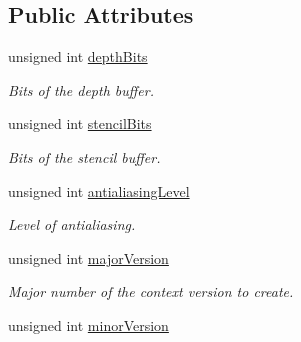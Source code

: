 \subsection*{Public Attributes}
\begin{DoxyCompactItemize}
\item 
\mbox{\label{structsf_1_1_context_settings_a4809e22089c2af7276b8809b5aede7bb}} 
unsigned int \hyperlink{structsf_1_1_context_settings_a4809e22089c2af7276b8809b5aede7bb}{depth\+Bits}
\begin{DoxyCompactList}\small\item\em Bits of the depth buffer. \end{DoxyCompactList}\item 
\mbox{\label{structsf_1_1_context_settings_ac2e788c201ca20e84fd38a28071abd29}} 
unsigned int \hyperlink{structsf_1_1_context_settings_ac2e788c201ca20e84fd38a28071abd29}{stencil\+Bits}
\begin{DoxyCompactList}\small\item\em Bits of the stencil buffer. \end{DoxyCompactList}\item 
\mbox{\label{structsf_1_1_context_settings_ac4a097be18994dba38d73f36b0418bdc}} 
unsigned int \hyperlink{structsf_1_1_context_settings_ac4a097be18994dba38d73f36b0418bdc}{antialiasing\+Level}
\begin{DoxyCompactList}\small\item\em Level of antialiasing. \end{DoxyCompactList}\item 
\mbox{\label{structsf_1_1_context_settings_a99a680d5c15a7e34c935654155dd5166}} 
unsigned int \hyperlink{structsf_1_1_context_settings_a99a680d5c15a7e34c935654155dd5166}{major\+Version}
\begin{DoxyCompactList}\small\item\em Major number of the context version to create. \end{DoxyCompactList}\item 
\mbox{\label{structsf_1_1_context_settings_aaeb0efe9d2658b840da93b30554b100f}} 
unsigned int \hyperlink{structsf_1_1_context_settings_aaeb0efe9d2658b840da93b30554b100f}{minor\+Version}

\end{DoxyCompactItemize}
